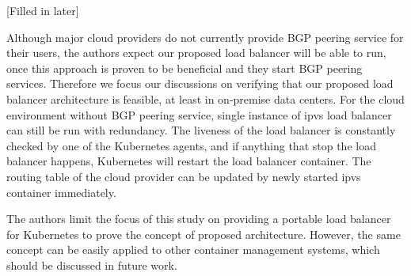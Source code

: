 [Filled in later]


Although major cloud providers do not currently provide BGP peering service for their users, the authors expect our proposed load balancer will be able to run, once this approach is proven to be beneficial and they start BGP peering services.
Therefore we focus our discussions on verifying that our proposed load balancer architecture is feasible, at least in on-premise data centers.
For the cloud environment without BGP peering service, single instance of ipvs load balancer can still be run with redundancy.
The liveness of the load balancer is constantly checked by one of the Kubernetes agents, and if anything that stop the load balancer happens, Kubernetes will restart the load balancer container.
The routing table of the cloud provider can be updated by newly started ipvs container immediately.

The authors limit the focus of this study on providing a portable load balancer for Kubernetes to prove the concept of proposed architecture.
However, the same concept can be easily applied to other container management systems, which should be discussed in future work.

